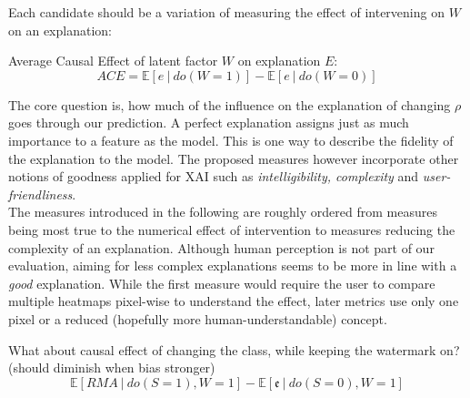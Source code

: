 Each candidate should be a variation of measuring the effect of intervening on $W$ on an explanation:
\begin{center}
Average Causal Effect of latent factor $W$ on explanation $E$: \\
\begin{equation}
\displaystyle ACE = \mathbb{E} [e \ | \ do(W=1) ] - \mathbb{E} [ e \ | \ do(W=0) ]
\end{equation}
\end{center}
The core question is, how much of the influence on the explanation of changing $\rho$ goes through our prediction. A perfect explanation assigns just as much importance to a feature as the model. This is one way to describe the fidelity of the explanation to the model. The proposed measures however incorporate other notions of goodness applied for XAI such as \textit{intelligibility, complexity} and \textit{user-friendliness}. \\

The measures introduced in the following are roughly ordered from measures being most true to the numerical effect of intervention to measures reducing the complexity of an explanation. Although human perception is not part of our evaluation, aiming for less complex explanations seems to be more in line with a \textit{good} explanation. While the first measure would require the user to compare multiple heatmaps pixel-wise to understand the effect, later metrics use only one pixel or a reduced (hopefully more human-understandable) concept. 

{\color{gray}
What about causal effect of changing the class, while keeping the watermark on? (should diminish when bias stronger)
\begin{equation}\displaystyle
    \mathbb{E} [RMA \ | \ do(S=1), W = 1  ] - \mathbb{E} [ \mathfrak{e} \ | \ do(S=0), W = 1 ]
\end{equation}
}


